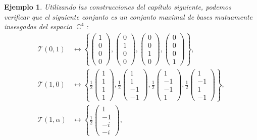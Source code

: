 \documentclass[a4paper]{report}
\DeclareMathOperator{\C}{\mathbb{C}}
\newtheorem{example}{Ejemplo}
\begin{document}
\begin{example}
    Utilizando las construcciones del capítulo siguiente,
    podemos verificar que el siguiente conjunto es un
    conjunto maximal de bases mutuamente insesgadas del
    espacio $\C^{4}$:
    \begin{align}
      \mathcal T(0,1) &\leftrightarrow \left\{
      \begin{pmatrix} 1\\0\\0\\0 \end{pmatrix},
      \begin{pmatrix} 0\\1\\0\\0 \end{pmatrix},
      \begin{pmatrix} 0\\0\\1\\0 \end{pmatrix},
      \begin{pmatrix} 0\\0\\0\\1 \end{pmatrix}
      \right\}, \\
      \mathcal T(1,0) &\leftrightarrow \left\{
      \frac{1}{2} \begin{pmatrix} 1\\1\\1\\1 \end{pmatrix}, 
      \frac{1}{2} \begin{pmatrix} 1\\1\\-1\\-1 \end{pmatrix}, 
      \frac{1}{2} \begin{pmatrix} 1\\-1\\-1\\1 \end{pmatrix},
      \frac{1}{2} \begin{pmatrix} 1\\-1\\1\\-1 \end{pmatrix} 
      \right\}, \\
      \mathcal T(1,\alpha) &\leftrightarrow \left\{
      \frac{1}{2} \begin{pmatrix} 1\\-1\\-i\\-i \end{pmatrix}, 

\end{align}
\end{example}
\end{document}
